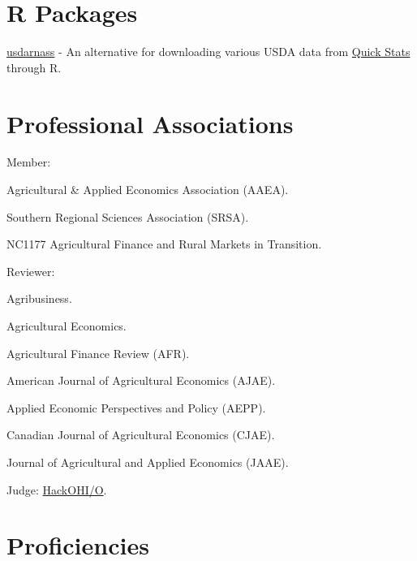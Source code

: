 \documentclass[letterpaper]{article}
\renewenvironment{itemize}{
  \begin{list}{}{
    \setlength{\leftmargin}{1.5em}
  }
}{
  \end{list}
}
\begin{document}
\newpage


\section*{R Packages}

\begin{itemize}
\item \href{https://rdinter.github.io/usdarnass/}{usdarnass} - An alternative for downloading various USDA data from \href{https://quickstats.nass.usda.gov/}{Quick Stats} through R.
\end{itemize}


\section*{Professional Associations}

\begin{itemize}
\item Member:
  \begin{itemize}
  \item Agricultural \& Applied Economics Association (AAEA).
  \item Southern Regional Sciences Association (SRSA).
  \item NC1177 Agricultural Finance and Rural Markets in Transition.
  \end{itemize}
\item Reviewer:
  \begin{itemize}
  \item Agribusiness.
  \item Agricultural Economics.
  \item Agricultural Finance Review (AFR).
  \item American Journal of Agricultural Economics (AJAE).
  \item Applied Economic Perspectives and Policy (AEPP).
  \item Canadian Journal of Agricultural Economics (CJAE).
  \item Journal of Agricultural and Applied Economics (JAAE).
  \end{itemize}
\item Judge: \href{http://hack.osu.edu/2016/}{HackOHI/O}.
\end{itemize}


\section*{Proficiencies}
\end{document}
